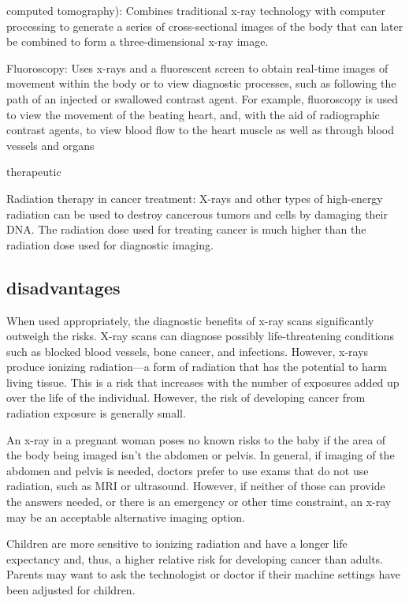 \documentclass{article}
\begin{document}
computed tomography): Combines traditional x-ray technology with computer processing to generate a series of cross-sectional images of the body that can later be combined to form a three-dimensional x-ray image.

Fluoroscopy: Uses x-rays and a fluorescent screen to obtain real-time images of movement within the body or to view diagnostic processes, such as following the path of an injected or swallowed contrast agent. For example, fluoroscopy is used to view the movement of the beating heart, and, with the aid of radiographic contrast agents, to view blood flow to the heart muscle as well as through blood vessels and organs

therapeutic

Radiation therapy in cancer treatment: X-rays and other types of high-energy radiation can be used to destroy cancerous tumors and cells by damaging their DNA. The radiation dose used for treating cancer is much higher than the radiation dose used for diagnostic imaging.

\subsection{disadvantages}

When used appropriately, the diagnostic benefits of x-ray scans significantly outweigh the risks. X-ray scans can diagnose possibly life-threatening conditions such as blocked blood vessels, bone cancer, and infections. However, x-rays produce ionizing radiation—a form of radiation that has the potential to harm living tissue. This is a risk that increases with the number of exposures added up over the life of the individual. However, the risk of developing cancer from radiation exposure is generally small.

An x-ray in a pregnant woman poses no known risks to the baby if the area of the body being imaged isn’t the abdomen or pelvis. In general, if imaging of the abdomen and pelvis is needed, doctors prefer to use exams that do not use radiation, such as MRI or ultrasound. However, if neither of those can provide the answers needed, or there is an emergency or other time constraint, an x-ray may be an acceptable alternative imaging option.

Children are more sensitive to ionizing radiation and have a longer life expectancy and, thus, a higher relative risk for developing cancer than adults. Parents may want to ask the technologist or doctor if their machine settings have been adjusted for children.


%
%
\end{document}
